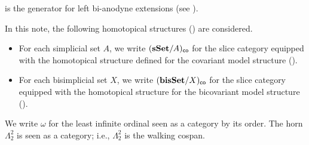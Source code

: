 \documentclass[a4paper,  dvipsnames, 11pt]{amsart}
\begin{document}
is the generator for left bi-anodyne extensions (see \cite[Definition 5.5.10]{Cis19}).
\begin{notation}
	In this note, the following homotopical structures (\cite[Definition 2.4.11]{Cis19}) are considered.
	\begin{itemize}
		\item %
			For each simplicial set $A$,
			we write $(\mathbf{sSet}/A)_{\mathsf{co}}$ for the slice category equipped with the homotopical structure defined for the covariant model structure
			(\cite[\S 4.1 and Theorem 4.4.14]{Cis19}).
		\item %
			For each bisimplicial set $X$,
			we write $(\mathbf{bisSet}/X)_{\mathsf{co}}$ for the slice category equipped with the homotopical structure for the bicovariant model structure
			(\cite[Lemma 5.5.12 and Theorem 5.5.13]{Cis19}).
		\qedhere %
	\end{itemize}
\end{notation}
We write $\omega$ for the least infinite ordinal seen as a category by its order.
The horn $\Lambda^2_2$ is seen as a category; i.e., $\Lambda^2_2$ is the walking cospan.
\end{document}
